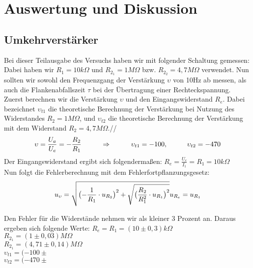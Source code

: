 

\chapter{Auswertung und Diskussion}
\label{chap:versuchsauswertung}


%
\section{Umkehrverstärker}
Bei dieser Teilausgabe des Versuchs haben wir mit folgender Schaltung gemessen:
Dabei haben wir $R_1=10k\Omega$ und $R_{2_1}=1M\Omega$ bzw. $R_{2_2}=4,7M\Omega$ verwendet. Nun sollten wir sowohl den Frequenzgang der Verstärkung $\upsilon$ von 10Hz ab messen, als auch die Flankenabfallszeit $\tau$ bei der Übertragung einer Rechteckspannung.\\
Zuerst berechnen wir die Verstärkung $\upsilon$ und den Eingangswiderstand $R_e$. Dabei bezeichnet $\upsilon_{t1}$ die theoretische Berechnung der Verstärkung bei Nutzung des Widerstandes $R_2=1M\Omega$, und $\upsilon_{t2}$ die theoretische Berechnung der Verstärkung mit dem Widerstand $R_2=4,7M\Omega$.//
\begin{equation}
\upsilon=\frac{U_a}{U_e}=-\frac{R_2}{R_1} \hspace*{1cm} \Rightarrow \hspace*{1cm} \upsilon_{t1}= -100, \hspace*{1cm} \upsilon_{t2}=-470
\end{equation}
Der Eingangswiderstand ergibt sich folgendermaßen: $R_e=\frac{U_e}{I_1}=R_1=10k\Omega$\\
Nun folgt die Fehlerberechnung mit dem Fehlerfortpflanzungsgesetz:
\begin{equation}
u_{\upsilon}=\sqrt{\bigl(-\frac{1}{R_1}\cdot u_{R_2}\bigr)^2 + \sqrt{\bigl(\frac{R_2}{R_1^2}\cdot u_{R_1}\bigr)^2}}\\
u_{R_e}=u_{R_1}
\end{equation}

Den Fehler für die Widerstände nehmen wir als kleiner 3 Prozent an. Daraus ergeben sich folgende Werte:
$R_e=R_1=(10\pm 0,3)k\Omega$\\
$R_{2_1}=(1\pm 0,03)M\Omega$\\
$R_{2_1}=(4,71\pm 0,14)M\Omega$\\
$\upsilon_{t1}=(-100\pm$\\
$\upsilon_{t2}=(-470\pm$\\
\\
